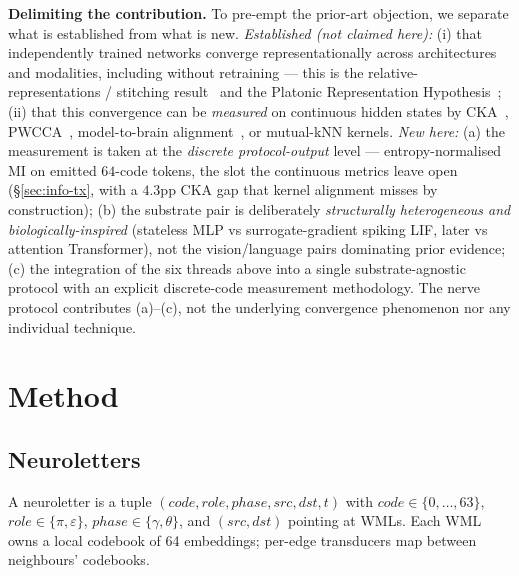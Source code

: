 \documentclass[10pt,twocolumn]{article}
\begin{document}
\textbf{Delimiting the contribution.}\label{sec:contribution-delim} To pre-empt the
prior-art objection, we separate what is established from what is new. \emph{Established
(not claimed here):} (i) that independently trained networks converge representationally
across architectures and modalities, including without retraining --- this is the relative-
representations / stitching result~\cite{moschella2022relative} and the Platonic
Representation Hypothesis~\cite{huh2024platonic}; (ii) that this convergence can be
\emph{measured} on continuous hidden states by CKA~\cite{kornblith2019similarity},
PWCCA~\cite{morcos2018insights}, model-to-brain alignment~\cite{hosseini2024universality}, or mutual-kNN kernels.
\emph{New here:} (a) the measurement is taken at the \emph{discrete protocol-output}
level --- entropy-normalised MI on emitted $64$-code tokens, the slot the continuous
metrics leave open (\S\ref{sec:info-tx}, with a $4.3$pp CKA gap that kernel alignment
misses by construction); (b) the substrate pair is deliberately \emph{structurally
heterogeneous and biologically-inspired} (stateless MLP vs surrogate-gradient spiking LIF,
later vs attention Transformer), not the vision/language pairs dominating prior evidence;
(c) the integration of the six threads above into a single substrate-agnostic protocol
with an explicit discrete-code measurement methodology. The nerve protocol contributes
(a)--(c), not the underlying convergence phenomenon nor any individual technique.

\section{Method}
\label{sec:method}

\subsection{Neuroletters}
A neuroletter is a tuple $(code, role, phase, src, dst, t)$ with
$code \in \{0, \dots, 63\}$, $role \in \{\pi, \varepsilon\}$,
$phase \in \{\gamma, \theta\}$, and $(src, dst)$ pointing at WMLs.
Each WML owns a local codebook of 64 embeddings; per-edge
transducers map between neighbours' codebooks.
\end{document}

